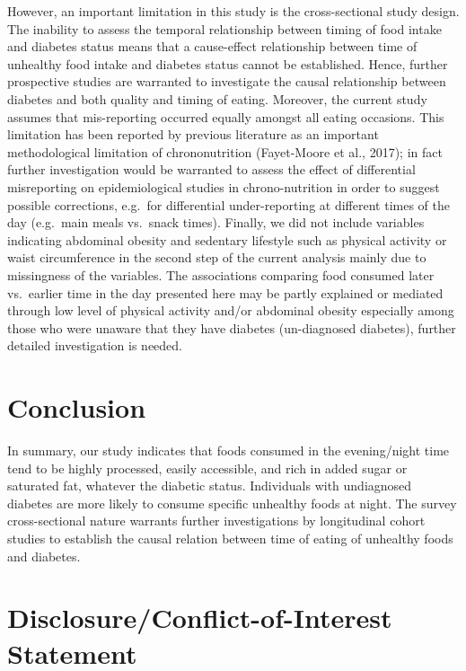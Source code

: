 \documentclass[utf8]{frontiersSCNS}
\begin{document}
However, an important limitation in this study is the cross-sectional
study design. The inability to assess the temporal relationship between
timing of food intake and diabetes status means that a cause-effect
relationship between time of unhealthy food intake and diabetes status
cannot be established. Hence, further prospective studies are warranted
to investigate the causal relationship between diabetes and both quality
and timing of eating. Moreover, the current study assumes that
mis-reporting occurred equally amongst all eating occasions. This
limitation has been reported by previous literature as an important
methodological limitation of chrononutrition (Fayet-Moore et al., 2017);
in fact further investigation would be warranted to assess the effect of
differential misreporting on epidemiological studies in chrono-nutrition
in order to suggest possible corrections, e.g.~for differential
under-reporting at different times of the day (e.g.~main meals vs.~snack
times). Finally, we did not include variables indicating abdominal
obesity and sedentary lifestyle such as physical activity or waist
circumference in the second step of the current analysis mainly due to
missingness of the variables. The associations comparing food consumed
later vs.~earlier time in the day presented here may be partly explained
or mediated through low level of physical activity and/or abdominal
obesity especially among those who were unaware that they have diabetes
(un-diagnosed diabetes), further detailed investigation is needed.

\hypertarget{conclusion}{%
\section*{Conclusion}\label{conclusion}}

In summary, our study indicates that foods consumed in the evening/night
time tend to be highly processed, easily accessible, and rich in added
sugar or saturated fat, whatever the diabetic status. Individuals with
undiagnosed diabetes are more likely to consume specific unhealthy foods
at night. The survey cross-sectional nature warrants further
investigations by longitudinal cohort studies to establish the causal
relation between time of eating of unhealthy foods and diabetes.

\hypertarget{disclosureconflict-of-interest-statement}{%
\section*{Disclosure/Conflict-of-Interest
Statement}\label{disclosureconflict-of-interest-statement}}
\end{document}
